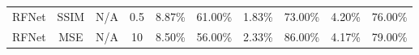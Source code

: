 \begin{table}[ht]
\begin{tabular}{cccccccccc}
    RFNet                  & SSIM                                                      & N/A                                                    & 0.5                    & 8.87\%         & 61.00\%        & 1.83\%        & 73.00\%       & 4.20\%         & 76.00\%       \\
    RFNet                  & MSE                                                       & N/A                                                    & 10                     & 8.50\%         & 56.00\%        & 2.33\%        & 86.00\%       & 4.17\%         & 79.00\%       \\ \hline
    \end{tabular}
    \label{attention}
\end{table}
